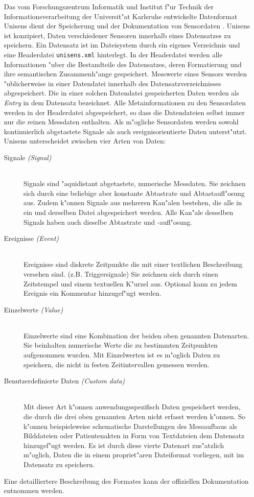 Das vom Forschungszentrum Informatik und Institut f"ur Technik der Informationsverarbeitung der Universit"at Karlsruhe entwickelte Datenformat Unisens dient der Speicherung und der Dokumentation von Sensordaten \cite{Kirst2008, Ottenbacher2010}.
Unisens ist konzipiert, Daten verschiedener Sensoren innerhalb eines Datensatzes zu speichern.
Ein Datensatz ist im Dateisystem durch ein eigenes Verzeichnis und eine Headerdatei \verb|unisens.xml| hinterlegt.
In der Headerdatei werden alle Informationen "uber die Bestandteile des Datensatzes, deren Formatierung und ihre semantischen Zusammenh"ange gespeichert.
Messwerte eines Sensors werden "ublicherweise in einer Datendatei innerhalb des Datensatzverzeichnisses abgespeichert.
Die in einer solchen Datendatei gespeicherten Daten werden als \emph{Entry} in dem Datensatz bezeichnet.
Alle Metainformationen zu den Sensordaten werden in der Headerdatei abgespeichert, so dass die Datendateien selbst immer nur die reinen Messdaten enthalten.
Als m"ogliche Sensordaten werden sowohl kontinuierlich abgetastete Signale als auch ereignisorientierte Daten unterst"utzt.
Unisens unterscheidet zwischen vier Arten von Daten:
\begin{description}
	\item[Signale \emph{(Signal)}] \hfill \\
		Signale sind "aquidistant abgetastete, numerische Messdaten.
		Sie zeichnen sich durch eine beliebige aber konstante Abtastrate und Abtastaufl"osung aus.
		Zudem k"onnen Signale aus mehreren Kan"alen bestehen, die alle in ein und derselben Datei abgespeichert werden.
		Alle Kan"ale desselben Signals haben auch dieselbe Abtastrate und -aufl"osung.
	\item[Ereignisse \emph{(Event)}] \hfill \\
		Ereignisse sind diskrete Zeitpunkte die mit einer textlichen Beschreibung versehen sind. (z.B. Triggersignale)
		Sie zeichnen sich durch einen Zeitstempel und einem textuellen K"urzel aus.
		Optional kann zu jedem Ereignis ein Kommentar hinzugef"ugt werden.
	\item[Einzelwerte \emph{(Value)}] \hfill \\
		Einzelwerte sind eine Kombination der beiden oben genannten Datenarten.
		Sie beinhalten numerische Werte die zu bestimmten Zeitpunkten aufgenommen wurden.
		Mit Einzelwerten ist es m"oglich Daten zu speichern, die nicht in festen Zeitintervallen gemessen werden.
	\item[Benutzerdefinierte Daten \emph{(Custom data)}] \hfill \\
		Mit dieser Art k"onnen anwendungsspezifisch Daten gespeichert werden, die durch die drei oben genannten Arten nicht erfasst werden k"onnen.
		So k"onnen beispielsweise schematische Darstellungen des Messaufbaus als Bilddateien oder Patientenakten in Form von Textdateien dem Datensatz hinzugef"ugt werden.
		Es ist durch diese vierte Datenart zus"atzlich m"oglich, Daten die in einem propriet"aren Dateiformat vorliegen, mit im Datensatz zu speichern.
\end{description}
Eine detailliertere Beschreibung des Formates kann der offiziellen Dokumentation \cite{Ottenbacher2010} entnommen werden.

